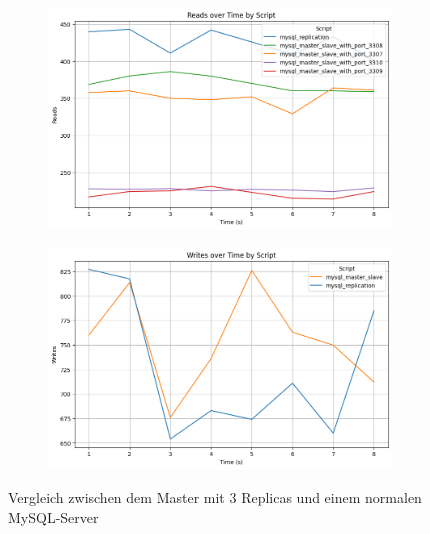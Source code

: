 \vspace{-8pt}
\begin{figure}[H]
  \centering
  \begin{subfigure}[t]{0.48\textwidth}
    \centering
    \includegraphics[width=\textwidth]{PNGs/Script/Replication/replication-vs-no/Reads}
  \end{subfigure}
  \hfill
  \begin{subfigure}[t]{0.48\textwidth}
    \centering
    \includegraphics[width=\textwidth]{PNGs/Script/Replication/replication-vs-no/Writes}
  \end{subfigure}
  \vspace{-20pt}
  \caption[Replikation: Master-Replica-Ansatz vs Single-Server]{Vergleich zwischen dem Master mit 3 Replicas und einem normalen MySQL-Server }
  \label{fig:replication-vs-no}
\end{figure}
\vspace{-20pt}

